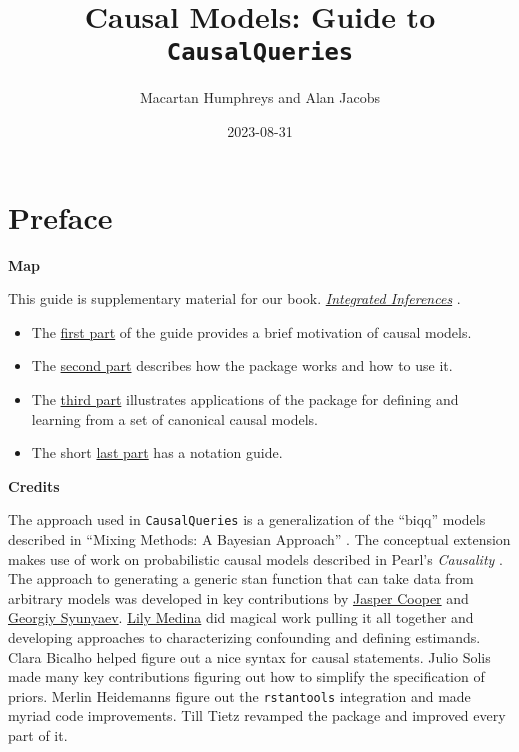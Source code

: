 \documentclass[
  12pt,
]{book}
\title{Causal Models: Guide to \texttt{CausalQueries}}
\author{Macartan Humphreys and Alan Jacobs}
\date{2023-08-31}
\providecommand{\tightlist}{%
  \setlength{\itemsep}{0pt}\setlength{\parskip}{0pt}}
\begin{document}
\maketitle

{
\setcounter{tocdepth}{1}
\tableofcontents
}
\hypertarget{preface}{%
\chapter*{Preface}\label{preface}}

\textbf{Map}

This guide is supplementary material for our book. \href{https://integrated-inferences.github.io/}{\emph{Integrated Inferences}} \citep{ii2023}.

\begin{itemize}
\tightlist
\item
  The \protect\hyperlink{cm}{first part} of the guide provides a brief motivation of causal models.
\item
  The \protect\hyperlink{package}{second part} describes how the package works and how to use it.
\item
  The \protect\hyperlink{applications}{third part} illustrates applications of the package for defining and learning from a set of canonical causal models.
\item
  The short \protect\hyperlink{notation}{last part} has a notation guide.
\end{itemize}

\textbf{Credits}

The approach used in \texttt{CausalQueries} is a generalization of the ``biqq'' models described in ``Mixing Methods: A Bayesian Approach'' \citep{humphreys2015mixing}. The conceptual extension makes use of work on probabilistic causal models described in Pearl's \emph{Causality} \citep{pearl2009causality}. The approach to generating a generic stan function that can take data from arbitrary models was developed in key contributions by \href{http://jasper-cooper.com/}{Jasper Cooper} and \href{http://gsyunyaev.com/}{Georgiy Syunyaev}. \href{https://lilymedina.github.io/}{Lily Medina} did magical work pulling it all together and developing approaches to characterizing confounding and defining estimands. Clara Bicalho helped figure out a nice syntax for causal statements. Julio Solis made many key contributions figuring out how to simplify the specification of priors. Merlin Heidemanns figure out the \texttt{rstantools} integration and made myriad code improvements. Till Tietz revamped the package and improved every part of it.
\end{document}
